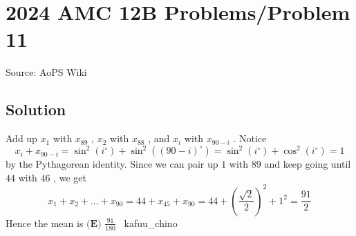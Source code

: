 \documentclass[12pt]{article}
\begin{document}
\section*{{2024 AMC 12B Problems/Problem 11}}
Source: AoPS Wiki

\subsection*{Solution}
Add up $x_1$ with $x_{89}$ , $x_2$ with $x_{88}$ , and $x_i$ with $x_{90-i}$ . Notice \[x_i+x_{90-i}=\sin^2(i^{\circ})+\sin^2((90-i)^{\circ})=\sin^2(i^{\circ})+\cos^2(i^{\circ})=1\] by the Pythagorean identity. Since we can pair up $1$ with $89$ and keep going until $44$ with $46$ , we get \[x_1+x_2+\dots+x_{90}=44+x_{45}+x_{90}=44+\left(\frac{\sqrt{2}}{2}\right)^2+1^2=\frac{91}{2}\] Hence the mean is $\boxed{\textbf{(E) }\frac{91}{180}}$ ~kafuu_chino
\end{document}

